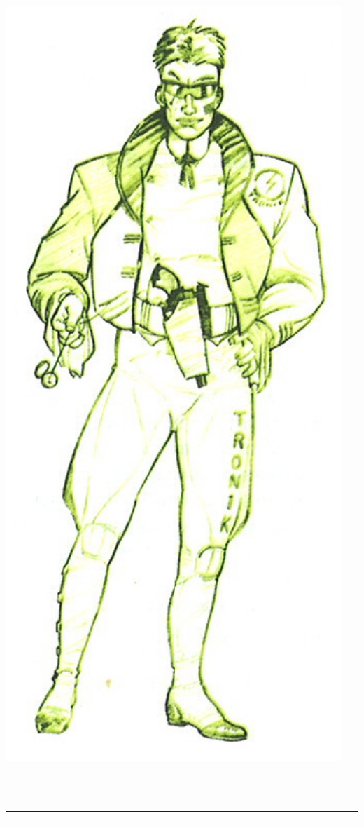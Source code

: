 \documentclass[40pt,twoside,a4paper]{article}
\begin{document}
\begin{minipage}[ht]{0.15\textwidth}
	\includegraphics[width=0.95\textwidth]{img/personnageJeremiahSteel.jpg} ~\\~\\
\end{minipage} ~\\

\hrule



\hrule

~\\
\end{document}
